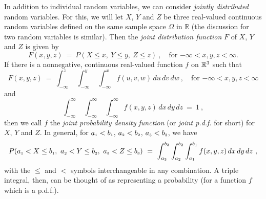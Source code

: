 In addition to individual random variables, we can consider \emph{jointly distributed} random variables. For this, we
will let $X$, $Y$ and $Z$ be three real-valued continuous random variables defined on the same sample space
$\Omega$ in $\mathbb{R}$ (the discussion for two random variables is similar). Then the \emph{joint distribution
function} $F$ of $X$, $Y$ and $Z$ is given by
\begin{equation}
 F(x,y,z) ~=~ P(X \le x,~Y \le y,~Z \le z)~, \quad \text{for $-\infty < x,y,z < \infty$.}
\end{equation}
If there is a nonnegative, continuous real-valued function $f$ on $\mathbb{R}^{3}$ such that
\begin{equation}\label{eqn:pdf3}
 F(x,y,z) 
 ~=~ 
 \int_{-\infty}^z \,\,
 \int_{-\infty}^y \,\,\int_{-\infty}^x 
 f(u,v,w)\,du\,dv\,dw~,
 \quad \text{for $-\infty < x,y,z < \infty$}
\end{equation}
and
\begin{equation}\label{eqn:pdfint3}
\int_{-\infty}^{\infty}\,\, \int_{-\infty}^{\infty}\,\, \int_{-\infty}^{\infty} f(x,y,z)\,dx\,dy\,dz ~=~ 1 ~,
\end{equation}
then we call $f$ the \emph{joint probability density function} (or \emph{joint p.d.f.} for short) for $X$, $Y$ and $Z$.
In general, for $a_{\scriptscriptstyle 1} < b_{\scriptscriptstyle 1}$, $a_{\scriptscriptstyle 2} < b_{\scriptscriptstyle 2}$, $a_{\scriptscriptstyle 3} < b_{\scriptscriptstyle 3}$, we have
\begin{equation}\label{eqn:pdfprob3}
 P(a_{\scriptscriptstyle 1} < X \le b_{\scriptscriptstyle 1},~a_{\scriptscriptstyle 2} < Y \le b_{\scriptscriptstyle 2},~a_{\scriptscriptstyle 3} < Z \le b_{\scriptscriptstyle 3}) ~=~
 \int_{a_{\scriptscriptstyle 3}}^{b_{\scriptscriptstyle 3}}\int_{a_{\scriptscriptstyle 2}}^{b_{\scriptscriptstyle 2}}\int_{a_{\scriptscriptstyle 1}}^{b_{\scriptscriptstyle 1}} f(x,y,z)\,dx\,dy\,dz~,
\end{equation}
with the $\le$ and $<$ symbols interchangeable in any combination. A triple integral, then, can be thought of as
representing a probability (for a function $f$ which is a p.d.f.).

